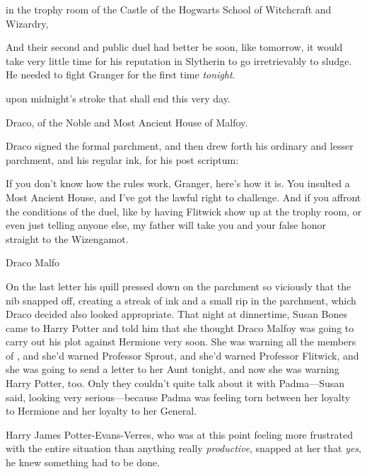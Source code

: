 \begin{writtenNote}
in the trophy room of the Castle of the Hogwarts School of Witchcraft and 
Wizardry,
\end{writtenNote}

And their second and public duel had better be soon, like tomorrow, it would 
take very little time for his reputation in Slytherin to go irretrievably to 
sludge. He needed to fight Granger for the first time \emph{tonight}.

\begin{writtenNote}
upon midnight's stroke that shall end this very day.

Draco, of the Noble and Most Ancient House of Malfoy.
\end{writtenNote}

Draco signed the formal parchment, and then drew forth his ordinary and lesser 
parchment, and his regular ink, for his post scriptum:

\begin{writtenNote}
If you don't know how the rules work, Granger, here's how it is. You 
insulted a Most Ancient House, and I've got the lawful right to challenge. And 
if you affront the conditions of the duel, like by having Flitwick show up at 
the trophy room, or even just telling anyone else, my father will take you and 
your false honor straight to the Wizengamot.

Draco Malfo
\end{writtenNote}

On the last letter his quill pressed down on the parchment so viciously that 
the nib snapped off, creating a streak of ink and a small rip in the parchment, 
which Draco decided also looked appropriate.
\sbreak
That night at dinnertime, Susan Bones came to Harry Potter and told him that 
she thought Draco Malfoy was going to carry out his plot against Hermione very 
soon. She was warning all the members of \SPHEW, and she'd warned Professor 
Sprout, and she'd warned Professor Flitwick, and she was going to send a letter 
to her Aunt tonight, and now she was warning Harry Potter, too. Only they 
couldn't quite talk about it with Padma---Susan said, looking very 
serious---because Padma was feeling torn between her loyalty to Hermione and 
her loyalty to her General.

Harry James Potter-Evans-Verres, who was at this point feeling more frustrated 
with the entire situation than anything really \emph{productive}, snapped at 
her that \emph{yes}, he knew something had to be done.

